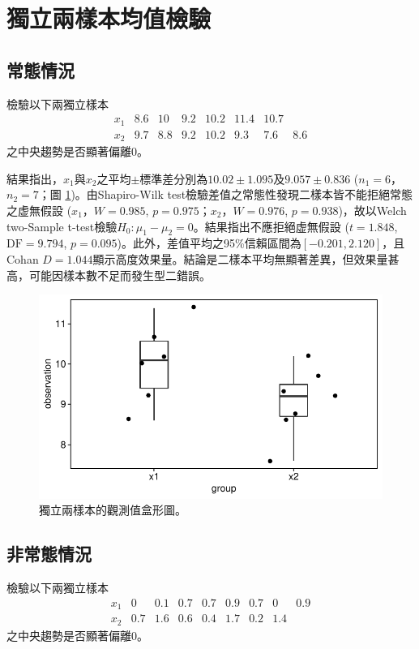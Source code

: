 \documentclass[12pt, a4paper, onecolumn]{article}
\begin{document}
\section{獨立兩樣本均值檢驗}
\subsection{常態情況}
檢驗以下兩獨立樣本
\[
\begin{matrix}
x_1 & 8.6 & 10 & 9.2 & 10.2 & 11.4 & 10.7 & \\
x_2 & 9.7 & 8.8 & 9.2 & 10.2 & 9.3 & 7.6 & 8.6
\end{matrix}
\]
之中央趨勢是否顯著偏離0。

結果指出，$x_1$與$x_2$之平均$\pm$標準差分別為$10.02 \pm 1.095$及$9.057 \pm 0.836$ ($n_1 = 6$，$n_2 = 7$；圖 \ref{fig:normal_independent_test})。由Shapiro-Wilk test檢驗差值之常態性發現二樣本皆不能拒絕常態之虚無假設 ($x_1$，$W = 0.985$, $p = 0.975$；$x_2$，$W = 0.976$, $p = 0.938$)，故以Welch two-Sample t-test檢驗$H_0: \mu_1 - \mu_2 = 0$。結果指出不應拒絕虚無假設 ($t = 1.848$, $\text{DF} = 9.794$, $p = 0.095$)。此外，差值平均之95\%信賴區間為$\left[-0.201, 2.120\right]$，且Cohan $D = 1.044$顯示高度效果量。結論是二樣本平均無顯著差異，但效果量甚高，可能因樣本數不足而發生型二錯誤。

\begin{figure}[htb]
	\centering
	\includegraphics[]{normal_independent_test.pdf}
	\caption{獨立兩樣本的觀測值盒形圖。}
	\label{fig:normal_independent_test}
\end{figure}

\subsection{非常態情況}
檢驗以下兩獨立樣本
\[
\begin{matrix}
x_1 & 0 & 0.1 & 0.7 & 0.7 & 0.9 & 0.7 & 0 & 0.9 \\
x_2 & 0.7 & 1.6 & 0.6 & 0.4 & 1.7 & 0.2 & 1.4 & 
\end{matrix}
\]
之中央趨勢是否顯著偏離0。
\end{document}
